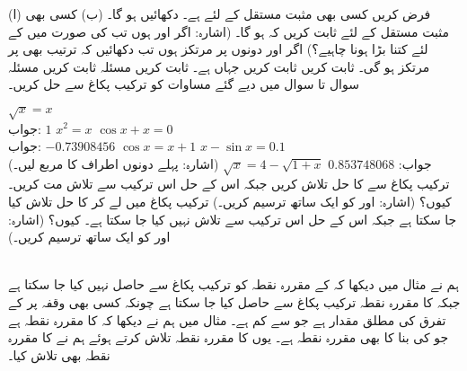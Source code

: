 (ا) فرض کریں کسی بھی مثبت مستقل  کے لئے  ہے۔ دکھائیں  ہو گا۔ (ب) کسی بھی مثبت مستقل  کے لئے ثابت کریں کہ  ہو گا۔ (اشارہ: اگر  اور  ہوں تب  کی صورت میں  کے لئے  کتنا بڑا ہونا چاہیے؟)
اگر  اور  دونوں  پر مرتکز ہوں تب دکھائیں کہ ترتیب  بھی  پر مرتکز ہو گی۔
ثابت کریں 
ثابت کریں  جہاں  ہے۔
ثابت کریں مسئلہ 
ثابت کریں مسئلہ 
\\
سوال  تا سوال  میں دیے گئے مساوات کو ترکیب پکاغ سے حل کریں۔

$\sqrt{x}=x$\\
جواب:\quad
$1$
$x^2=x$
$\cos x+x=0$\\
جواب:\quad
$-0.73908456$
$\cos x=x+1$
$x-\sin x=0.1$\\
جواب:\quad
$0.853748068$
$\sqrt{x}=4-\sqrt{1+x}$\quad
(اشارہ: پہلے دونوں اطراف کا مربع لیں۔)
ترکیب پکاغ سے  کا حل  تلاش کریں جبکہ اس کے حل  اس ترکیب سے تلاش مت کریں۔ کیوں؟ (اشارہ:  اور  کو ایک ساتھ ترسیم کریں۔)
ترکیب پکاغ میں  لے کر  کا حل   تلاش کیا جا سکتا ہے جبکہ اس کے حل  اس ترکیب سے تلاش نہیں کیا جا سکتا ہے۔ کیوں؟ (اشارہ:  اور  کو ایک ساتھ ترسیم کریں۔)

\\
ہم نے مثال  میں دیکھا کہ  کے مقررہ نقطہ کو ترکیب پکاغ سے حاصل نہیں کیا جا سکتا ہے جبکہ   کا مقررہ نقطہ ترکیب پکاغ سے حاصل کیا جا سکتا ہے چونکہ کسی بھی وقفہ پر  کے تفرق  کی مطلق مقدار  ہے جو  سے کم ہے۔ مثال  میں ہم نے دیکھا کہ  کا مقررہ نقطہ  ہے  جو  کی بنا  کا بھی مقررہ نقطہ ہے۔ یوں  کا مقررہ نقطہ تلاش کرتے ہوئے ہم نے  کا مقررہ نقطہ بھی تلاش کیا۔

